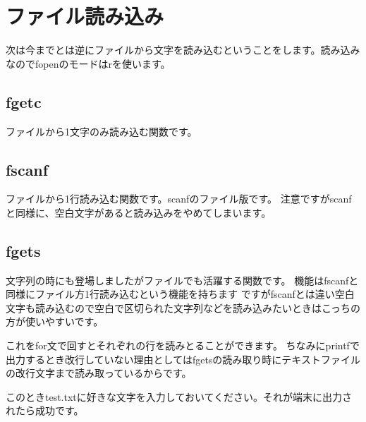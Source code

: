 \section{ファイル読み込み}
次は今までとは逆にファイルから文字を読み込むということをします。読み込みなのでfopenのモードはrを使います。

\subsection{fgetc}
ファイルから1文字のみ読み込む関数です。



\subsection{fscanf}
ファイルから1行読み込む関数です。scanfのファイル版です。
注意ですがscanfと同様に、空白文字があると読み込みをやめてしまいます。



\subsection{fgets}
文字列の時にも登場しましたがファイルでも活躍する関数です。
機能はfscanfと同様にファイル方1行読み込むという機能を持ちます
ですがfscanfとは違い空白文字も読み込むので空白で区切られた文字列などを読み込みたいときはこっちの方が使いやすいです。



これをfor文で回すとそれぞれの行を読みとることができます。
ちなみにprintfで出力するとき改行していない理由としてはfgetsの読み取り時にテキストファイルの改行文字まで読み取っているからです。


このときtest.txtに好きな文字を入力しておいてください。それが端末に出力されたら成功です。


